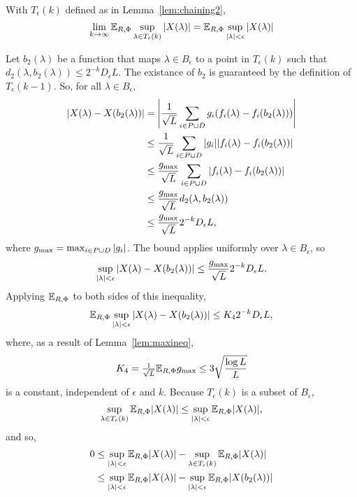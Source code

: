 \documentclass[journal]{IEEEtran}
\begin{document}
\begin{lemma}\label{lem:limexpTk} With $T_\epsilon(k)$ defined as in Lemma~\ref{lem:chaining2},
\[
\lim_{k\rightarrow\infty}{\mathbb E}_{R,\Phi}\sup_{\lambda \in T_\epsilon(k)} {\vert X(\lambda) \vert} = {\mathbb E}_{R,\Phi} \sup_{{\vert \lambda \vert} < \epsilon} {\vert X(\lambda) \vert}
\]
\end{lemma}
\begin{IEEEproof}
Let $b_2(\lambda)$ be a function that maps $\lambda \in B_\epsilon$ to a point in $T_\epsilon(k)$ such that  $d_2(\lambda,b_2(\lambda)) \leq 2^{-k}D_\epsilon L$.  The existance of $b_2$ is guaranteed by the definition of $T_\epsilon(k-1)$.  So, for all $\lambda \in B_\epsilon$,
\begin{align*}
{\vert X(\lambda) - X(b_2(\lambda)) \vert} &= {\left\vert \frac{1}{\sqrt{L}}\sum_{i\in P \cup D}g_i(f_i(\lambda) - f_i(b_2(\lambda))) \right\vert} \\
&\leq  \frac{1}{\sqrt{L}}\sum_{i\in P \cup D}{\left\vert g_i \right\vert}{\vert f_i(\lambda) - f_i(b_2(\lambda)) \vert} \\
&\leq \frac{g_\text{max}}{\sqrt{L}} \sum_{i\in P \cup D}{\vert f_i(\lambda) - f_i(b_2(\lambda)) \vert} \\
&\leq \frac{g_\text{max}}{\sqrt{L}} d_2(\lambda,b_2(\lambda)) \\
&\leq \frac{g_\text{max}}{\sqrt{L}} 2^{-k} D_\epsilon L,
\end{align*}
where $g_\text{max} = \max_{i\in P\cup D} {\left\vert g_i \right\vert}$. The bound applies uniformly over $\lambda \in B_\epsilon$, so
\[
\sup_{{\vert \lambda \vert} < \epsilon} {\vert X(\lambda) - X(b_2(\lambda)) \vert} \leq \frac{g_\text{max}}{\sqrt{L}} 2^{-k} D_\epsilon L.
\]
Applying ${\mathbb E}_{R,\Phi}$ to both sides of this inequality,
\[
{\mathbb E}_{R,\Phi} \sup_{{\vert \lambda \vert} < \epsilon} {\vert X(\lambda) - X(b_2(\lambda)) \vert} \leq K_4 2^{-k} D_\epsilon L,
\]
where, as a result of Lemma~\ref{lem:maxineq},
\[
K_4 = \tfrac{1}{\sqrt{L}}{\mathbb E}_{R,\Phi} g_\text{max} \leq 3 \sqrt{\frac{\log L}{L}}
\]
is a constant, independent of $\epsilon$ and $k$.  Because $T_\epsilon(k)$ is a subset of $B_\epsilon$,
\[
\sup_{\lambda \in T_\epsilon(k)} {\mathbb E}_{R,\Phi} {\vert X(\lambda) \vert} \leq \sup_{{\vert \lambda \vert} < \epsilon} {\mathbb E}_{R,\Phi} {\vert X(\lambda) \vert},
\]
and so,
\begin{align}
0 &\leq \sup_{\sabs{\lambda} < \epsilon} \expect_{R,\Phi} \sabs{X(\lambda)} - \sup_{\lambda \in T_\epsilon(k)} \expect_{R,\Phi} \sabs{X(\lambda)} \nonumber \\
&\leq \sup_{\sabs{\lambda} < \epsilon} \expect_{R,\Phi} \sabs{X(\lambda)} - \sup_{\sabs{\lambda} < \epsilon} \expect_{R,\Phi} \sabs{X(b_2(\lambda))} \nonumber \\

\end{align}
\end{IEEEproof}
\end{document}
